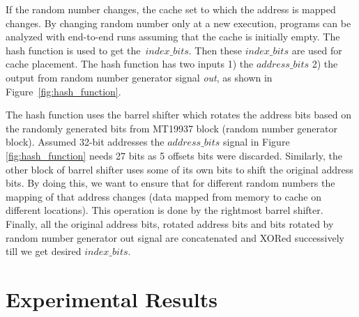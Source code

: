 If the random number changes, the cache set to which the address is mapped changes. By changing random number only at a new execution, programs can be analyzed with end-to-end runs assuming that the cache is initially empty. The hash function is used to get the~\textit{$index\_bits$}. Then these \textit{$index\_bits$} are used for cache placement. The hash function has two inputs 1) the \textit{$address\_bits$} 2) the output from random number generator signal \textit{out}, as shown in Figure~\ref{fig:hash_function}. 



The hash function uses the barrel shifter which rotates the address bits based on the randomly generated bits from MT19937 block (random number generator block).  Assumed 32-bit addresses the \textit{$address\_bits$} signal in Figure \ref{fig:hash_function} needs 27 bits as 5 offsets bits were discarded. Similarly, the other block of barrel shifter uses some of its own bits to shift the original address bits. By doing this, we want to ensure that for different random numbers the mapping of that address changes (data mapped from memory to cache on different locations). This operation is done by the rightmost barrel shifter. Finally, all the original address bits, rotated address bits and bits rotated by random number generator out signal are concatenated and XORed successively till we get desired \textit{$index\_bits$}.








\section{Experimental Results}


